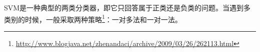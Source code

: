 \documentclass[12pt]{article}
\begin{document}
SVM是一种典型的两类分类器，即它只回答属于正类还是负类的问题。当遇到多类别的时候，一般采取两种策略\footnote{\url{http://www.blogjava.net/zhenandaci/archive/2009/03/26/262113.html}}：一对多法和一对一法。
%    
%    
\end{document}
